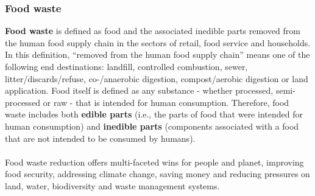 \documentclass[../summary.tex]{subfiles}
\begin{document}
\subsubsection{Food waste}

\textbf{Food waste} is defined as food and the associated inedible parts removed from the human food supply chain in the sectors of retail, food service and households. In this definition, “removed from the human food supply chain” means one of the following end destinations: landfill, controlled combustion, sewer, litter/discards/refuse, co-/anaerobic digestion, compost/aerobic digestion or land application. Food itself is defined as any substance - whether processed, semi-processed or raw - that is intended for human consumption. Therefore, food waste includes both \textbf{edible parts} (i.e., the parts of food that were intended for human consumption) and \textbf{inedible parts} (components associated with a food that are not intended to be consumed by humans).
\\\\
Food waste reduction offers multi-faceted wins for people and planet, improving food security, addressing climate change, saving money and reducing pressures on land, water, biodiversity and waste management systems.
\end{document}
